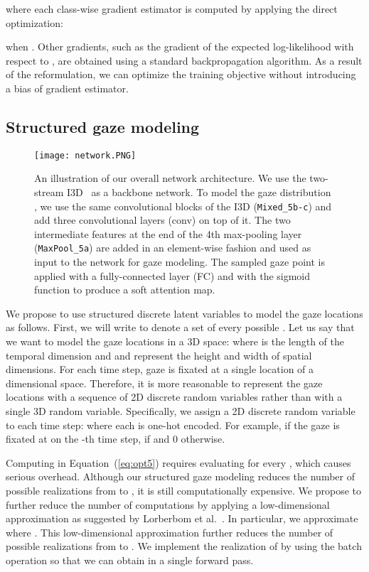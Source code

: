 \documentclass[10pt,twocolumn,letterpaper]{article}
\begin{document}
where each class-wise gradient estimator  is computed by applying the direct optimization:

when . Other gradients, such as the gradient of the expected log-likelihood with respect to , are obtained using a standard backpropagation algorithm. As a result of the reformulation, we can optimize the training objective without introducing a bias of gradient estimator.

\subsection{Structured gaze modeling} \label{subsec:gaze-modeling}

\begin{figure*}[t]
  \centering
  \texttt{[image: network.PNG]}
  \caption{An illustration of our overall network architecture. We use the two-stream I3D~\cite{carreira2017quo} as a backbone network. To model the gaze distribution , we use the same convolutional blocks of the I3D (\texttt{Mixed\_5b-c}) and add three convolutional layers (conv) on top of it. The two intermediate features at the end of the 4th max-pooling layer (\texttt{MaxPool\_5a}) are added in an element-wise fashion and used as input to the network for gaze modeling. The sampled gaze point is applied with a fully-connected layer (FC) and with the sigmoid function to produce a soft attention map.
  \label{fig:network}
  }
\end{figure*}

We propose to use structured discrete latent variables to model the gaze locations as follows. First, we will write  to denote a set of every possible . Let us say that we want to model the gaze locations in a 3D space:  where  is the length of the temporal dimension and  and  represent the height and width of spatial dimensions. For each time step, gaze is fixated at a single location of a  dimensional space. Therefore, it is more reasonable to represent the gaze locations with a sequence of 2D discrete random variables rather than with a single 3D random variable. Specifically, we assign a 2D discrete random variable to each time step:  where each  is one-hot encoded. For example, if the gaze is fixated at  on the -th time step,  if  and 0 otherwise.

Computing  in Equation~(\ref{eq:opt5}) requires evaluating  for every , which causes serious overhead. Although our structured gaze modeling reduces the number of possible realizations from  to , it is still computationally expensive. We propose to further reduce the number of computations by applying a low-dimensional approximation as suggested by Lorberbom et al.~\cite{lorberbom2018direct}. In particular, we approximate  where . This low-dimensional approximation further reduces the number of possible realizations from  to . We implement the realization of  by using the batch operation so that we can obtain  in a single forward pass.
\end{document}
